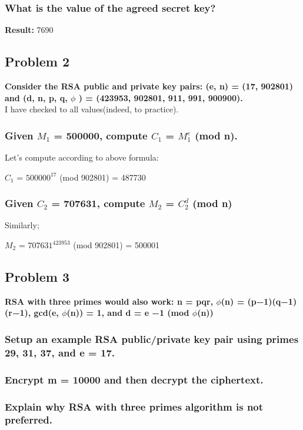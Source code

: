 \documentclass[11pt]{article}
\begin{document}
  
\newpage\subsubsection{\textbf{What is the value of the agreed secret key?}}

\textbf{Result: }7690

\subsection{Problem 2} \textbf{Consider the RSA public and private key pairs: (e, n) = (17, 902801) and (d, n, p, q, $\phi $ ) =
(423953, 902801, 911, 991, 900900).}\\
 
I have checked to all values(indeed, to practice). 

\subsubsection{\textbf{Given $M_{1}$ = 500000, compute $C_{1}$ = $M_{1}^{e}$ (mod n).}}

Let's compute according to above  formula:

$C_{1}$ = $500000^{17}$ (mod 902801) = 487730

\subsubsection{\textbf{Given $C_{2}$ = 707631, compute $M_{2}$ = $C_{2}^{d}$  (mod n)}}

Similarly; 

$M_{2}$ = $707631^{423953}$ (mod 902801) = 500001

\subsection{Problem 3} \textbf{RSA with three primes would also work: n = pqr, $\phi $(n) = (p−1)(q−1)(r−1), gcd(e, $\phi $(n)) = 1,
and d = e −1 (mod $\phi $(n))}

\subsubsection{\textbf{Setup an example RSA public/private key pair using primes 29, 31, 37, and e = 17.}}

\subsubsection{\textbf{Encrypt m = 10000 and then decrypt the ciphertext.}}

\subsubsection{\textbf{Explain why RSA with three primes algorithm is not preferred.}}
\end{document}
